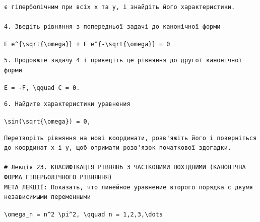 \documentclass[
  ukrainian,
]{article}
\begin{document}
\begin{verbatim}
є гіперболічним при всіх x та y, і знайдіть його характеристики.

4. Зведіть рівняння з попередньої задачі до канонічної форми
\end{verbatim}

\texttt{E\ e\^{}\{\textbackslash{}sqrt\{\textbackslash{}omega\}\}\ +\ F\ e\^{}\{-\textbackslash{}sqrt\{\textbackslash{}omega\}\}\ =\ 0}

\begin{verbatim}
5. Продовжте задачу 4 і приведіть це рівняння до другої канонічної форми
\end{verbatim}

\texttt{E\ =\ -F,\ \textbackslash{}qquad\ C\ =\ 0.}

\begin{verbatim}
6. Найдите характеристики уравнения
\end{verbatim}

\texttt{\textbackslash{}sin(\textbackslash{}sqrt\{\textbackslash{}omega\})\ =\ 0,}

\begin{verbatim}
Перетворіть рівняння на нові координати, розв'яжіть його і поверніться до координат x і y, щоб отримати розв'язок початкової здогадки.

# Лекція 23. КЛАСИФІКАЦІЯ РІВНЯНЬ З ЧАСТКОВИМИ ПОХІДНИМИ (КАНОНІЧНА ФОРМА ГІПЕРБОЛІЧНОГО РІВНЯННЯ)
МЕТА ЛЕКЦІЇ: Показать, что линейное уравнение второго порядка с двумя независимыми переменными
\end{verbatim}

\texttt{\textbackslash{}omega\_n\ =\ n\^{}2\ \textbackslash{}pi\^{}2,\ \textbackslash{}qquad\ n\ =\ 1,2,3,\textbackslash{}dots}
\end{document}
